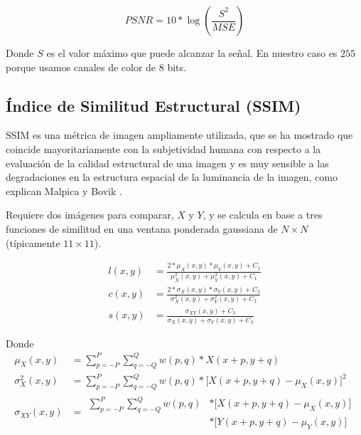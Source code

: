 \documentclass[pregrado]{tesis-usb} %
\begin{document}
\begin{equation}\label{eq:psnr}
PSNR=10*\log\left(\frac{S^2}{MSE}\right)
\end{equation}

Donde $S$ es el valor máximo que puede alcanzar la señal. En nuestro caso es $255$ porque usamos canales de color de 8 bits.

\subsection{Índice de Similitud Estructural (SSIM)}
SSIM es una métrica de imagen ampliamente utilizada, que se ha mostrado que coincide mayoritariamente con la subjetividad humana con respecto a la evaluación de la calidad estructural de una imagen y es muy sensible a las degradaciones en la estructura espacial de la luminancia de la imagen, como explican Malpica y Bovik \cite{Malpica2009}. 

Requiere dos imágenes para comparar, $X$ y $Y$, y se calcula en base a tres funciones de similitud en una ventana ponderada gaussiana de $N\times N$ (típicamente $11\times 11$).

\begin{equation}\label{eq:ssim_components}
\begin{split}
l(x,y) & = \frac{2*\mu_X(x,y)*\mu_Y(x,y)+C_1}{\mu_X^2(x,y)+\mu_Y^2(x,y)+C_1} \\ 
c(x,y) & = \frac{2*\sigma_X(x,y)*\sigma_Y(x,y)+C_2}{\sigma_X^2(x,y)+\sigma_Y^2(x,y)+C_2} \\ 
s(x,y) & = \frac{\sigma_{XY}(x,y)+C_3}{\sigma_X(x,y)+\sigma_Y(x,y)+C_3}
\end{split}
\end{equation}

Donde
\begin{equation*}
\begin{split}
\mu_X(x,y) & = \sum\limits_{p=-P}^{P} \sum\limits_{q=-Q}^{Q} w(p,q)*X(x+p,y+q)\\ 
\sigma_X^2(x,y) & = \sum\limits_{p=-P}^{P} \sum\limits_{q=-Q}^{Q} w(p,q)*\lbrack X(x+p,y+q)-\mu_X(x,y) \rbrack^2\\ 
\sigma_{XY}(x,y) & = \begin{split}\sum\limits_{p=-P}^{P} \sum\limits_{q=-Q}^{Q} w(p,q)& *\lbrack X(x+p,y+q)-\mu_X(x,y)\rbrack \\ & *\lbrack Y(x+p,y+q)-\mu_Y(x,y)\rbrack\end{split}
\end{split}
\end{equation*}
\end{document}

